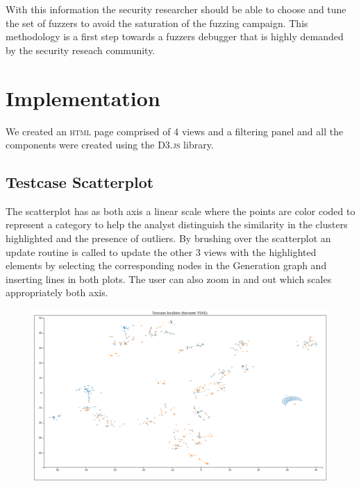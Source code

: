 \documentclass[conference,compsoc]{IEEEtran}
\begin{document}
With this information the security researcher should be able to choose and tune the set of fuzzers to avoid the saturation of the fuzzing campaign. This methodology is a first step towards a fuzzers debugger that is highly demanded by the security reseach community.


\section{Implementation}

We created an \textsc{html} page comprised of 4 views and a filtering panel and all the components were created using the \textsc{D3.js} library.
\subsection{Testcase Scatterplot}
 
The scatterplot has as both axis a linear scale  where the points are color coded to represent a category to help the analyst distinguish the similarity in the clusters highlighted and the presence of outliers.
By brushing over the scatterplot an update routine is called to update the other 3 views with the highlighted elements by selecting the corresponding nodes in the Generation graph and inserting lines in both plots.
The user can also zoom in and out which scales appropriately both axis.
\begin{figure}[H]
  \includegraphics[scale=0.2]{img/scatterplot}
  \label{fig:scatterplot}
\end{figure}
\end{document}
